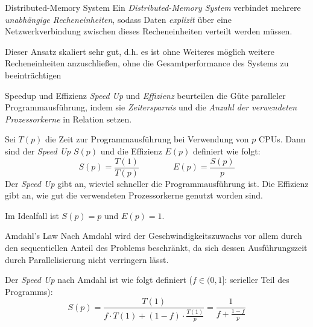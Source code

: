 \begin{defi}{Distributed-Memory System}
    Ein \emph{Distributed-Memory System} verbindet mehrere
    \emph{unabhängige Recheneinheiten}, sodass Daten \emph{explizit} über eine Netzwerkverbindung
    zwischen dieses Recheneinheiten verteilt werden müssen.

    Dieser Ansatz skaliert sehr gut, d.h. es ist
    ohne Weiteres möglich weitere Recheneinheiten anzuschließen, ohne die Gesamtperformance
    des Systems zu beeinträchtigen
\end{defi}

\begin{bonus}{Speedup und Effizienz}
    \emph{Speed Up} und \emph{Effizienz} beurteilen die Güte paralleler Programmausführung, indem sie \emph{Zeitersparnis} und die \emph{Anzahl der verwendeten Prozessorkerne} in Relation setzen.

    Sei $T(p)$ die Zeit zur Programmausführung bei Verwendung von $p$ CPUs. Dann sind der \emph{Speed Up} $S(p)$ und die Effizienz $E(p)$ definiert wie folgt:
    $$
        S(p) = \frac{T(1)}{T(p)} \qquad  \qquad E(p) = \frac{S(p)}{p}
    $$
    Der \emph{Speed Up} gibt an, wieviel schneller die Programmausführung ist.
    Die Effizienz gibt an, wie gut die verwendeten Prozessorkerne genutzt worden sind.

    Im Idealfall ist $S(p) = p$ und $E(p) = 1$.
\end{bonus}

\begin{bonus}{Amdahl's Law}
    Nach Amdahl wird der Geschwindigkeitszuwachs vor allem durch den sequentiellen Anteil des Problems beschränkt, da sich dessen Ausführungszeit durch Parallelisierung nicht verringern lässt.

    Der \emph{Speed Up} nach Amdahl ist wie folgt definiert ($f \in (0, 1]$: serieller Teil des Programms):
    $$
        S(p) = \frac{T(1)}{f \cdot T(1) + (1-f) \cdot \frac{T(1)}{p}} = \frac{1}{f + \frac{1-f}{p}}
    $$
\end{bonus}
